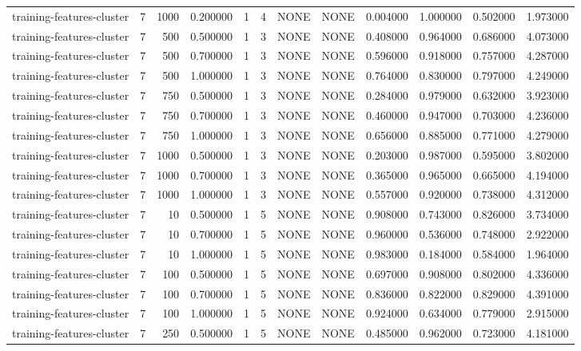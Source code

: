 \begin{tabular}{lrrrllllrrrr}
training-features-cluster & 7 & 1000 & 0.200000 & 1 & 4 & NONE & NONE & 0.004000 & 1.000000 & 0.502000 & 1.973000 \\
training-features-cluster & 7 & 500 & 0.500000 & 1 & 3 & NONE & NONE & 0.408000 & 0.964000 & 0.686000 & 4.073000 \\
training-features-cluster & 7 & 500 & 0.700000 & 1 & 3 & NONE & NONE & 0.596000 & 0.918000 & 0.757000 & 4.287000 \\
training-features-cluster & 7 & 500 & 1.000000 & 1 & 3 & NONE & NONE & 0.764000 & 0.830000 & 0.797000 & 4.249000 \\
training-features-cluster & 7 & 750 & 0.500000 & 1 & 3 & NONE & NONE & 0.284000 & 0.979000 & 0.632000 & 3.923000 \\
training-features-cluster & 7 & 750 & 0.700000 & 1 & 3 & NONE & NONE & 0.460000 & 0.947000 & 0.703000 & 4.236000 \\
training-features-cluster & 7 & 750 & 1.000000 & 1 & 3 & NONE & NONE & 0.656000 & 0.885000 & 0.771000 & 4.279000 \\
training-features-cluster & 7 & 1000 & 0.500000 & 1 & 3 & NONE & NONE & 0.203000 & 0.987000 & 0.595000 & 3.802000 \\
training-features-cluster & 7 & 1000 & 0.700000 & 1 & 3 & NONE & NONE & 0.365000 & 0.965000 & 0.665000 & 4.194000 \\
training-features-cluster & 7 & 1000 & 1.000000 & 1 & 3 & NONE & NONE & 0.557000 & 0.920000 & 0.738000 & 4.312000 \\
training-features-cluster & 7 & 10 & 0.500000 & 1 & 5 & NONE & NONE & 0.908000 & 0.743000 & 0.826000 & 3.734000 \\
training-features-cluster & 7 & 10 & 0.700000 & 1 & 5 & NONE & NONE & 0.960000 & 0.536000 & 0.748000 & 2.922000 \\
training-features-cluster & 7 & 10 & 1.000000 & 1 & 5 & NONE & NONE & 0.983000 & 0.184000 & 0.584000 & 1.964000 \\
training-features-cluster & 7 & 100 & 0.500000 & 1 & 5 & NONE & NONE & 0.697000 & 0.908000 & 0.802000 & 4.336000 \\
training-features-cluster & 7 & 100 & 0.700000 & 1 & 5 & NONE & NONE & 0.836000 & 0.822000 & 0.829000 & 4.391000 \\
training-features-cluster & 7 & 100 & 1.000000 & 1 & 5 & NONE & NONE & 0.924000 & 0.634000 & 0.779000 & 2.915000 \\
training-features-cluster & 7 & 250 & 0.500000 & 1 & 5 & NONE & NONE & 0.485000 & 0.962000 & 0.723000 & 4.181000 \\

\end{tabular}
